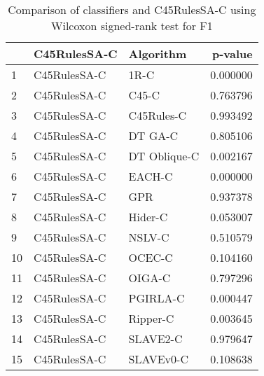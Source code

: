\begin{table}
\footnotesize
\caption{Comparison of classifiers and C45RulesSA-C using Wilcoxon signed-rank test for F1}
\label{tab:C45RulesSA-C wilcoxon F1 comparison}
\begin{tabular}{lllr}
\hline
 & C45RulesSA-C & Algorithm & p-value \\
\hline
1 & C45RulesSA-C & 1R-C & 0.000000 \\
2 & C45RulesSA-C & C45-C & 0.763796 \\
3 & C45RulesSA-C & C45Rules-C & 0.993492 \\
4 & C45RulesSA-C & DT GA-C & 0.805106 \\
5 & C45RulesSA-C & DT Oblique-C & 0.002167 \\
6 & C45RulesSA-C & EACH-C & 0.000000 \\
7 & C45RulesSA-C & GPR & 0.937378 \\
8 & C45RulesSA-C & Hider-C & 0.053007 \\
9 & C45RulesSA-C & NSLV-C & 0.510579 \\
10 & C45RulesSA-C & OCEC-C & 0.104160 \\
11 & C45RulesSA-C & OIGA-C & 0.797296 \\
12 & C45RulesSA-C & PGIRLA-C & 0.000447 \\
13 & C45RulesSA-C & Ripper-C & 0.003645 \\
14 & C45RulesSA-C & SLAVE2-C & 0.979647 \\
15 & C45RulesSA-C & SLAVEv0-C & 0.108638 \\
\hline
\end{tabular}
\end{table}
